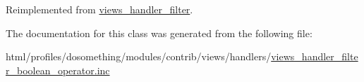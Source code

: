 Reimplemented from \hyperlink{classviews__handler__filter_a55b051bcd047b7251e6dbbece8e0a081}{views\_\-handler\_\-filter}.

The documentation for this class was generated from the following file:\begin{DoxyCompactItemize}
\item 
html/profiles/dosomething/modules/contrib/views/handlers/\hyperlink{views__handler__filter__boolean__operator_8inc}{views\_\-handler\_\-filter\_\-boolean\_\-operator.inc}\end{DoxyCompactItemize}
